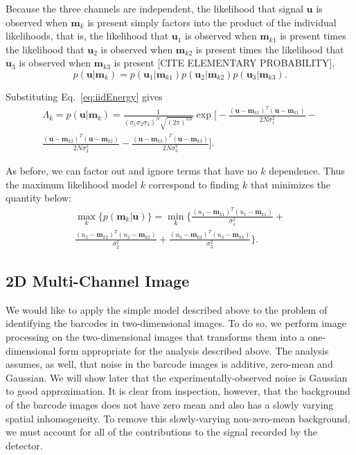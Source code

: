 Because the three channels are independent, the likelihood that signal $\mathbf{u}$ is observed when $\mathbf{m}_k$ is present simply factors into the product of the individual likelihoods, that is, the likelihood that $\mathbf{u}_1$ is observed when $\mathbf{m}_{k1}$ is present times the likelihood that $\mathbf{u}_2$ is observed when $\mathbf{m}_{k2}$ is present times the likelihood that $\mathbf{u}_3$ is observed when $\mathbf{m}_{k3}$ is present [CITE ELEMENTARY PROBABILITY],
\begin{equation}
p(\mathbf{u}|\mathbf{m}_k) = p(\mathbf{u}_1|\mathbf{m}_{k1})p(\mathbf{u}_2|\mathbf{m}_{k2})p(\mathbf{u}_3|\mathbf{m}_{k3}).
\end{equation}

Substituting Eq.~\ref{eq:iidEnergy} gives
\begin{multline}
\Lambda_k=p(\mathbf{u}|\mathbf{m}_k) =\frac{1}{ (\sigma_1\sigma_2\sigma_3)^N  \sqrt{ (2\pi)^{3N}}  }  \exp\Bigg[ -\frac{(\mathbf{u}-\mathbf{m}_{k1})^T(\mathbf{u}-\mathbf{m}_{k1})} {2 N \sigma_1^2 }   - \\ \frac{(\mathbf{u}-\mathbf{m}_{k2})^T(\mathbf{u}-\mathbf{m}_{k2})} {2 N \sigma_2^2 } -\frac{(\mathbf{u}-\mathbf{m}_{k3})^T(\mathbf{u}-\mathbf{m}_{k3})} {2 N \sigma_3^2 }    \Bigg].
\end{multline}

As before, we can factor out and ignore terms that have no $k$ dependence. Thus the maximum likelihood model $k$ correspond to finding $k$ that minimizes the quantity below:
\begin{multline}
\max_k   \big\{ p(\mathbf{m}_k|\mathbf{u}) \big\} =  \min_k  \Bigg\{  \frac{(u_1-\mathbf{m}_{k1})^T(u_1-\mathbf{m}_{k1})}{\sigma_1^2} +\\  
\frac{(u_2-\mathbf{m}_{k2})^T(u_2-\mathbf{m}_{k2})}{\sigma_2^2} + \frac{(u_3-\mathbf{m}_{k3})^T(u_3-\mathbf{m}_{k3})}{\sigma_3^2} \Bigg\}. 
\end{multline}




\subsection{2D Multi-Channel Image}
We would like to apply the simple model described above to the problem of identifying the barcodes in two-dimensional images. To do so, we perform image processing on the two-dimensional images that transforms them into a one-dimensional form appropriate for the analysis described above. The analysis assumes, as well, that noise in the barcode images is additive, zero-mean and Gaussian. We will show later that the experimentally-observed noise is Gaussian to good approximation. It is clear from inspection, however, that the background of the barcode images does not have zero mean and also has a slowly varying spatial inhomogeneity. To remove this slowly-varying non-zero-mean background, we must account for all of the contributions to the signal recorded by the detector.


